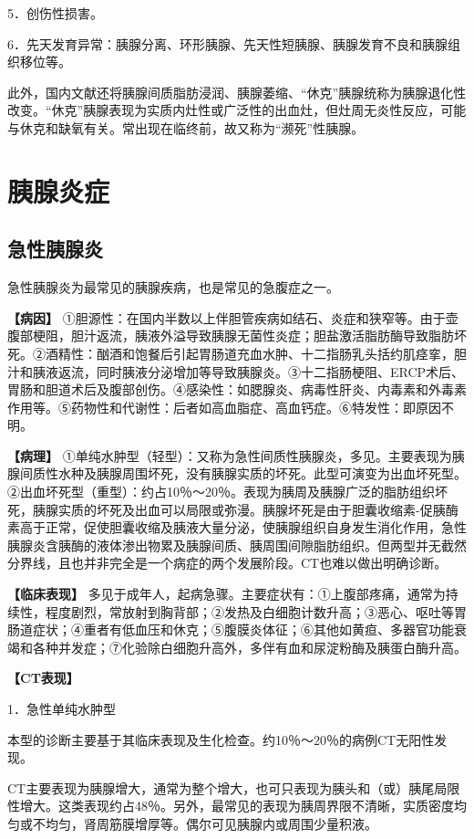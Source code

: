 5．创伤性损害。

6．先天发育异常：胰腺分离、环形胰腺、先天性短胰腺、胰腺发育不良和胰腺组织移位等。

此外，国内文献还将胰腺间质脂肪浸润、胰腺萎缩、“休克”胰腺统称为胰腺退化性改变。“休克”胰腺表现为实质内灶性或广泛性的出血灶，但灶周无炎性反应，可能与休克和缺氧有关。常出现在临终前，故又称为“濒死”性胰腺。

\section{胰腺炎症}

\subsection{急性胰腺炎}

急性胰腺炎为最常见的胰腺疾病，也是常见的急腹症之一。

\textbf{【病因】}
①胆源性：在国内半数以上伴胆管疾病如结石、炎症和狭窄等。由于壶腹部梗阻，胆汁返流，胰液外溢导致胰腺无菌性炎症；胆盐激活脂肪酶导致脂肪坏死。②酒精性：酗酒和饱餐后引起胃肠道充血水肿、十二指肠乳头括约肌痉挛，胆汁和胰液返流，同时胰液分泌增加等导致胰腺炎。③十二指肠梗阻、ERCP术后、胃肠和胆道术后及腹部创伤。④感染性：如腮腺炎、病毒性肝炎、内毒素和外毒素作用等。⑤药物性和代谢性：后者如高血脂症、高血钙症。⑥特发性：即原因不明。

\textbf{【病理】}
①单纯水肿型（轻型）：又称为急性间质性胰腺炎，多见。主要表现为胰腺间质性水种及胰腺周围坏死，没有胰腺实质的坏死。此型可演变为出血坏死型。②出血坏死型（重型）：约占10％～20％。表现为胰周及胰腺广泛的脂肪组织坏死，胰腺实质的坏死及出血可以局限或弥漫。胰腺坏死是由于胆囊收缩素-促胰酶素高于正常，促使胆囊收缩及胰液大量分泌，使胰腺组织自身发生消化作用，急性胰腺炎含胰酶的液体渗出物累及胰腺间质、胰周围间隙脂肪组织。但两型并无截然分界线，且也并非完全是一个病症的两个发展阶段。CT也难以做出明确诊断。

\textbf{【临床表现】}
多见于成年人，起病急骤。主要症状有：①上腹部疼痛，通常为持续性，程度剧烈，常放射到胸背部；②发热及白细胞计数升高；③恶心、呕吐等胃肠道症状；④重者有低血压和休克；⑤腹膜炎体征；⑥其他如黄疸、多器官功能衰竭和各种并发症；⑦化验除白细胞升高外，多伴有血和尿淀粉酶及胰蛋白酶升高。

\textbf{【CT表现】}

1．急性单纯水肿型

本型的诊断主要基于其临床表现及生化检查。约10％～20％的病例CT无阳性发现。

CT主要表现为胰腺增大，通常为整个增大，也可只表现为胰头和（或）胰尾局限性增大。这类表现约占48％。另外，最常见的表现为胰周界限不清晰，实质密度均匀或不均匀，肾周筋膜增厚等。偶尔可见胰腺内或周围少量积液。


